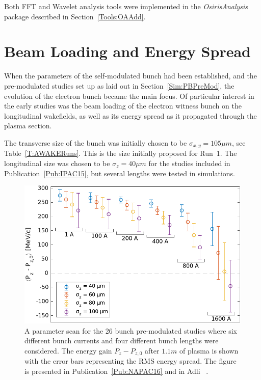 Both FFT and Wavelet analysis tools were implemented in the \textit{OsirisAnalysis} package described in Section~\ref{Tools:OAAdd}.

\section{Beam Loading and Energy Spread}
\label{SimA:BLoad}

When the parameters of the self-modulated bunch had been established, and the pre-modulated studies set up as laid out in Section~\ref{Sim:PBPreMod}, the evolution of the electron bunch became the main focus.
Of particular interest in the early studies was the beam loading of the electron witness bunch on the longitudinal wakefields, as well as its energy spread as it propagated through the plasma section.

The transverse size of the bunch was initially chosen to be $\sigma_{x,y}=105\unit{\mu m}$, see Table~\ref{T:AWAKERuns}.
This is the size initially proposed for Run~1.
The longitudinal size was chosen to be $\sigma_{z}=40\unit{\mu m}$ for the studies included in Publication~\ref{Pub:IPAC15}, but several lengths were tested in simulations.

\begin{figure}[hbt]
    \centering
    \includegraphics[width=0.625\linewidth]{figures/NAPACEGainSpreadScan}
    \caption{\label{Fig:SimA:BLoadScan}
        A parameter scan for the 26 bunch pre-modulated studies where six different bunch currents and four different bunch lengths were considered.
        The energy gain $P_{z} - P_{z,0}$ after $1.1\unit{m}$ of plasma is shown with the error bars representing the RMS energy spread.
        The figure is presented in Publication~\ref{Pub:NAPAC16} and in Adli \etal~\cite{adli:2016a}.
    }
\end{figure}

